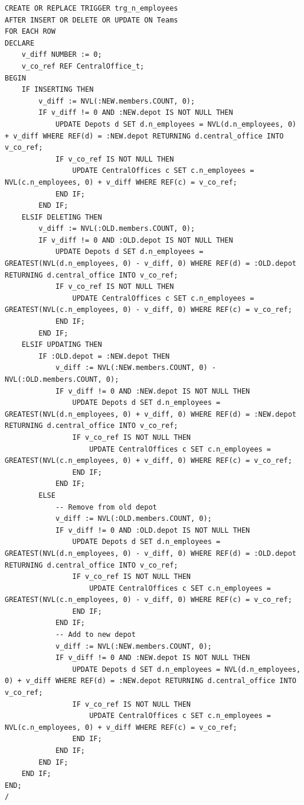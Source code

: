 \begin{verbatim}
CREATE OR REPLACE TRIGGER trg_n_employees
AFTER INSERT OR DELETE OR UPDATE ON Teams
FOR EACH ROW
DECLARE
    v_diff NUMBER := 0;
    v_co_ref REF CentralOffice_t;
BEGIN
    IF INSERTING THEN
        v_diff := NVL(:NEW.members.COUNT, 0);
        IF v_diff != 0 AND :NEW.depot IS NOT NULL THEN
            UPDATE Depots d SET d.n_employees = NVL(d.n_employees, 0) + v_diff WHERE REF(d) = :NEW.depot RETURNING d.central_office INTO v_co_ref;
            IF v_co_ref IS NOT NULL THEN
                UPDATE CentralOffices c SET c.n_employees = NVL(c.n_employees, 0) + v_diff WHERE REF(c) = v_co_ref;
            END IF;
        END IF;
    ELSIF DELETING THEN
        v_diff := NVL(:OLD.members.COUNT, 0);
        IF v_diff != 0 AND :OLD.depot IS NOT NULL THEN
            UPDATE Depots d SET d.n_employees = GREATEST(NVL(d.n_employees, 0) - v_diff, 0) WHERE REF(d) = :OLD.depot RETURNING d.central_office INTO v_co_ref;
            IF v_co_ref IS NOT NULL THEN
                UPDATE CentralOffices c SET c.n_employees = GREATEST(NVL(c.n_employees, 0) - v_diff, 0) WHERE REF(c) = v_co_ref;
            END IF;
        END IF;
    ELSIF UPDATING THEN
        IF :OLD.depot = :NEW.depot THEN
            v_diff := NVL(:NEW.members.COUNT, 0) - NVL(:OLD.members.COUNT, 0);
            IF v_diff != 0 AND :NEW.depot IS NOT NULL THEN
                UPDATE Depots d SET d.n_employees = GREATEST(NVL(d.n_employees, 0) + v_diff, 0) WHERE REF(d) = :NEW.depot RETURNING d.central_office INTO v_co_ref;
                IF v_co_ref IS NOT NULL THEN
                    UPDATE CentralOffices c SET c.n_employees = GREATEST(NVL(c.n_employees, 0) + v_diff, 0) WHERE REF(c) = v_co_ref;
                END IF;
            END IF;
        ELSE
            -- Remove from old depot
            v_diff := NVL(:OLD.members.COUNT, 0);
            IF v_diff != 0 AND :OLD.depot IS NOT NULL THEN
                UPDATE Depots d SET d.n_employees = GREATEST(NVL(d.n_employees, 0) - v_diff, 0) WHERE REF(d) = :OLD.depot RETURNING d.central_office INTO v_co_ref;
                IF v_co_ref IS NOT NULL THEN
                    UPDATE CentralOffices c SET c.n_employees = GREATEST(NVL(c.n_employees, 0) - v_diff, 0) WHERE REF(c) = v_co_ref;
                END IF;
            END IF;
            -- Add to new depot
            v_diff := NVL(:NEW.members.COUNT, 0);
            IF v_diff != 0 AND :NEW.depot IS NOT NULL THEN
                UPDATE Depots d SET d.n_employees = NVL(d.n_employees, 0) + v_diff WHERE REF(d) = :NEW.depot RETURNING d.central_office INTO v_co_ref;
                IF v_co_ref IS NOT NULL THEN
                    UPDATE CentralOffices c SET c.n_employees = NVL(c.n_employees, 0) + v_diff WHERE REF(c) = v_co_ref;
                END IF;
            END IF;
        END IF;
    END IF;
END;
/
\end{verbatim}

